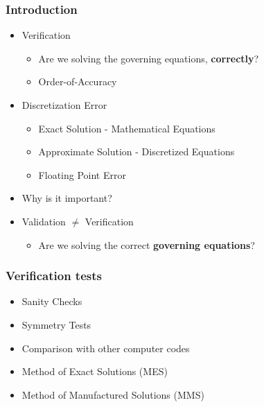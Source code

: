 \documentclass[10pt]{beamer}
\begin{document}
 
\begin{frame}
    \frametitle{Introduction}
    \begin{itemize}
        \item Verification
            \begin{itemize}
                \item Are we solving the governing equations, \textbf{correctly}?
                \item Order-of-Accuracy
            \end{itemize}
        \item Discretization Error
            \begin{itemize}
                \item Exact Solution - Mathematical Equations
                \item Approximate Solution - Discretized Equations
                \item Floating Point Error
            \end{itemize}
        \item Why is it important?
        \item Validation $\ne$ Verification
            \begin{itemize}
                \item Are we solving the correct \textbf{governing equations}?
            \end{itemize}
    \end{itemize}
\end{frame}


\begin{frame}
    \frametitle{Verification tests}
    \begin{itemize}
        \item Sanity Checks
        \item Symmetry Tests
        \item Comparison with other computer codes
        \item Method of Exact Solutions (MES)
        \item Method of Manufactured Solutions (MMS)
    \end{itemize}
\end{frame}
\end{document}
